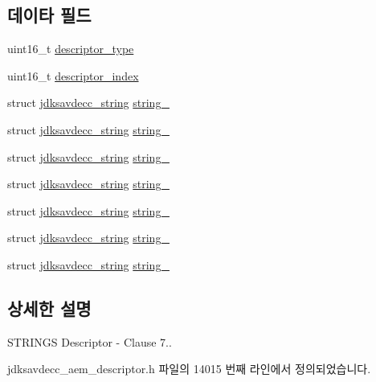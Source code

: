 \subsection*{데이타 필드}
\begin{DoxyCompactItemize}
\item 
uint16\+\_\+t \hyperlink{structjdksavdecc__descriptor__strings_ab7c32b6c7131c13d4ea3b7ee2f09b78d}{descriptor\+\_\+type}
\item 
uint16\+\_\+t \hyperlink{structjdksavdecc__descriptor__strings_a042bbc76d835b82d27c1932431ee38d4}{descriptor\+\_\+index}
\item 
struct \hyperlink{structjdksavdecc__string}{jdksavdecc\+\_\+string} \hyperlink{structjdksavdecc__descriptor__strings_a5dd7040ccaf4a1f44c30a7b0be194876}{string\+\_}
\item 
struct \hyperlink{structjdksavdecc__string}{jdksavdecc\+\_\+string} \hyperlink{structjdksavdecc__descriptor__strings_a74069f3a05ccbf123fc33d25e826408f}{string\+\_}
\item 
struct \hyperlink{structjdksavdecc__string}{jdksavdecc\+\_\+string} \hyperlink{structjdksavdecc__descriptor__strings_a2faecc14963d86b076a4a99a19794698}{string\+\_}
\item 
struct \hyperlink{structjdksavdecc__string}{jdksavdecc\+\_\+string} \hyperlink{structjdksavdecc__descriptor__strings_a8d22d22c70580e2881107d33d5699668}{string\+\_}
\item 
struct \hyperlink{structjdksavdecc__string}{jdksavdecc\+\_\+string} \hyperlink{structjdksavdecc__descriptor__strings_a12315da39ae0832d37bc88da374e32b7}{string\+\_}
\item 
struct \hyperlink{structjdksavdecc__string}{jdksavdecc\+\_\+string} \hyperlink{structjdksavdecc__descriptor__strings_a6f6720d47d1d4d6896b173f8a3509c58}{string\+\_}
\item 
struct \hyperlink{structjdksavdecc__string}{jdksavdecc\+\_\+string} \hyperlink{structjdksavdecc__descriptor__strings_a00c3c7fc6e427751d1a54b0d38513ad3}{string\+\_}
\end{DoxyCompactItemize}


\subsection{상세한 설명}
S\+T\+R\+I\+N\+GS Descriptor -\/ Clause 7.. 

jdksavdecc\+\_\+aem\+\_\+descriptor.\+h 파일의 14015 번째 라인에서 정의되었습니다.



